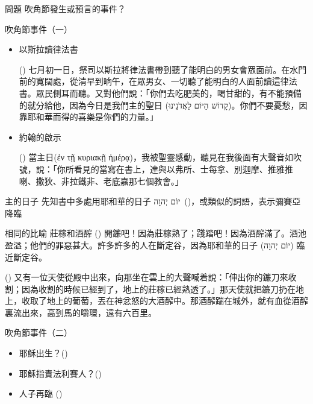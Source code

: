 \documentclass{beamer}
\newcommand{\question}[1]{
  \begin{frame}{問題}
    \centering
    \vspace*{1cm}
    \huge #1？\par
    \vfill
  \end{frame}
}
\newcommand{\parvspace}{\par\vspace{0.5em}}
\begin{document}
\question{吹角節發生或預言的事件}

\begin{frame}{吹角節事件（一）}
  \begin{itemize}
    \item 以斯拉讀律法書\par
      () \alert{七月初一日}，祭司以斯拉將律法書帶到聽了能明白的男女會眾面前。在水門前的寬闊處，從清早到晌午，在眾男女、一切聽了能明白的人面前讀這律法書。眾民側耳而聽。\textellipsis{}又對他們說：「你們去吃肥美的，喝甘甜的，有不能預備的就分給他，因為今日是\alert{我們主的聖日 (\texthebrew{קָדוֹשׁ הַיּוֹם לַאֲדֹנֵינוּ})}。你們不要憂愁，因靠耶和華而得的喜樂是你們的力量。」
    \item 約翰的啟示\par
      () \alert{當主日(\textgreek{ἐν τῇ κυριακῇ ἡμέρᾳ})}，我被聖靈感動，聽見在我後面\alert{有大聲音如吹號}，說：「你所看見的當寫在書上，達與以弗所、士每拿、別迦摩、推雅推喇、撒狄、非拉鐵非、老底嘉那七個教會。」
  \end{itemize}
\end{frame}

\begin{frame}{主的日子}
  先知書中多處用\alert{耶和華的日子 \texthebrew{יוֹם יְהוָה}}\ ()，或類似的詞語，表示\alert{彌賽亞降臨}\parvspace
\end{frame}

\begin{frame}{相同的比喻 \textemdash 莊稼和酒醡}
  () \alert{開鐮}吧！因為\alert{莊稼熟了}；踐踏吧！因為\alert{酒醡滿了}。酒池盈溢；他們的\alert{罪惡甚大}。許多許多的人在斷定谷，因為耶和華的日子 (\texthebrew{יוֹם יְהוָה}) 臨近斷定谷。\parvspace
  () 又有一位天使從殿中出來，向那坐在雲上的大聲喊着說：「\alert{伸出你的鐮刀來收割}；因為收割的時候已經到了，\alert{地上的莊稼已經熟透了}。」\textellipsis{}那天使就把鐮刀扔在地上，收取了地上的葡萄，丟在\alert{神忿怒的大酒醡中}。那酒醡踹在城外，就有血從酒醡裏流出來，\alert{高到馬的嚼環，遠有六百里}。\parvspace
\end{frame}

\begin{frame}{吹角節事件（二）}
  \begin{itemize}
    \item 耶穌出生？()
    \item 耶穌指責法利賽人？()\parencite{YeshuaInYomTeruah}
    \item 人子再臨 ()
  \end{itemize}
\end{frame}
\end{document}
